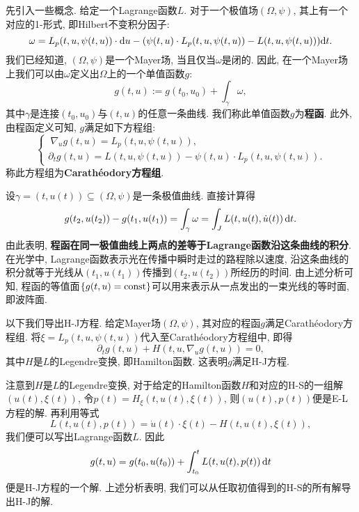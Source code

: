 先引入一些概念. 给定一个Lagrange函数$L$. 对于一个极值场$(\Omega, \psi)$, 其上有一个对应的1-形式, 即Hilbert不变积分因子:
\begin{equation*}
    \omega = L_p(t, u, \psi(t, u)) \cdot {\rm d}u - (\psi(t, u) \cdot L_p(t, u, \psi(t, u)) - L(t, u, \psi(t, u))) {\rm d}t.
\end{equation*}
我们已经知道, $(\Omega, \psi)$是一个Mayer场, 当且仅当$\omega$是闭的. 因此, 在一个Mayer场上我们可以由$\omega$定义出$\Omega$上的一个单值函数$g$:
\begin{equation*}
    \boxed{g(t, u) := g(t_0, u_0) + \int_{\gamma}\omega,}
\end{equation*}
其中$\gamma$是连接$(t_0, u_0)$与$(t, u)$的任意一条曲线. 我们称此单值函数$g$为\textbf{程函}.
此外, 由程函定义可知, $g$满足如下方程组:
\begin{equation*}
    \boxed{\begin{cases} \
        \nabla_ug(t, u) = L_p(t, u, \psi(t, u)), \\  
        \partial_tg(t, u) = L(t, u, \psi(t, u)) - \psi(t, u) \cdot L_p(t, u, \psi(t, u)). 
    \end{cases}}
\end{equation*}
称此方程组为\textbf{Carathéodory方程组}.

\begin{example}
    设$\gamma = (t, u(t)) \subseteq (\Omega, \psi)$是一条极值曲线. 直接计算得 
    \begin{equation*}
        g(t_2, u(t_2)) - g(t_1, u(t_1)) = \int_{\gamma}\omega = \int_JL(t, u(t), \dot u(t)) \,{\rm d}t.
    \end{equation*}
    由此表明, \textbf{程函在同一极值曲线上两点的差等于Lagrange函数沿这条曲线的积分}.
    在光学中, Lagrange函数表示光在传播中瞬时走过的路程除以速度, 沿这条曲线的积分就等于光线从$(t_1, u(t_1))$传播到$(t_2, u(t_2))$所经历的时间.
    由上述分析可知, 程函的等值面$\{g(t, u) = {\rm const}\}$可以用来表示从一点发出的一束光线的等时面, 即波阵面.
\end{example}

以下我们导出H-J方程. 给定Mayer场$(\Omega, \psi)$, 其对应的程函$g$满足Carathéodory方程组.
将$\xi = L_p(t, u, \psi(t, u))$代入至Carathéodory方程组中, 即得  
\begin{equation*}
    \partial_tg(t, u) + H(t, u, \nabla_ug(t, u)) = 0,
\end{equation*}
其中$H$是$L$的Legendre变换, 即Hamilton函数. 这表明$g$满足H-J方程.

\begin{remark}
    注意到$H$是$L$的Legendre变换, 对于给定的Hamilton函数$H$和对应的H-S的一组解$(u(t), \xi(t))$, 令$p(t) = H_{\xi}(t, u(t), \xi(t))$, 则$(u(t), p(t))$便是E-L方程的解. 再利用等式
    \begin{equation*}
        L(t, u(t), p(t)) = \dot u(t) \cdot \xi(t) - H(t, u(t), \xi(t)),
    \end{equation*} 
    我们便可以写出Lagrange函数$L$. 因此 
    \begin{equation*}
        g(t, u) = g(t_0, u(t_0)) + \int_{t_0}^t L(t, u(t), p(t)) \,{\rm d}t
    \end{equation*}
    便是H-J方程的一个解. 上述分析表明, 我们可以从任取初值得到的H-S的所有解导出H-J的解.
\end{remark}


